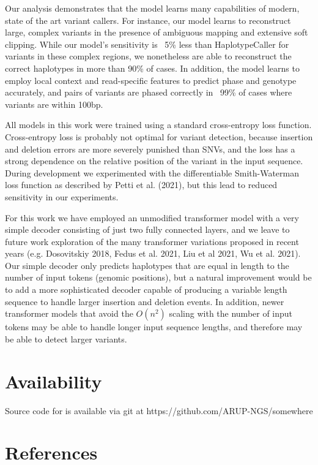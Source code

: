 \documentclass[]{article}
\begin{document}
Our analysis demonstrates that the model learns many capabilities of modern, state of the art variant callers. For instance, our model learns to reconstruct large, complex variants in the presence of ambiguous mapping and extensive soft clipping. While our model's sensitivity is ~5\% less than HaplotypeCaller for variants in these complex regions, we nonetheless are able to reconstruct the correct haplotypes in more than 90\% of cases.   In addition, the model learns to employ local context and read-specific features to predict phase and genotype accurately, and pairs of variants are phased correctly in ~99\% of cases where variants are within 100bp.  

All models in this work were trained using a standard cross-entropy loss function.  Cross-entropy loss is probably not optimal for variant detection, because insertion and deletion errors are more severely punished than SNVs, and the loss has a strong dependence on the relative position of the variant in the input sequence.  During development we experimented with the differentiable Smith-Waterman loss function as described by Petti et al. (2021), but this lead to reduced sensitivity in our experiments. 

For this work we have employed an unmodified transformer model with a very simple decoder consisting of just two fully connected layers, and we leave to future work exploration of the many transformer variations proposed in recent years (e.g. Dosovitskiy 2018, Fedus et al. 2021, Liu et al 2021, Wu et al. 2021). Our simple decoder only predicts haplotypes that are equal in length to the number of input tokens (genomic positions), but a natural improvement would be to add a more sophisticated decoder capable of producing a variable length sequence to handle larger insertion and deletion events.  In addition, newer transformer models that avoid the $O(n^2)$ scaling with the number of input tokens may be able to handle longer input sequence lengths, and therefore may be able to detect larger variants. 

\section{Availability}
 
 Source code for is available via git at https://github.com/ARUP-NGS/somewhere
 
\section{References}
\end{document}
